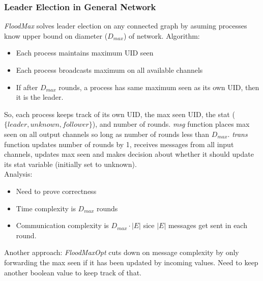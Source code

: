 \documentclass[a4paper,10pt,]{article}
\begin{document}
\subsubsection{Leader Election in General Network}
\emph{FloodMax} solves leader election on any connected graph by asuming processes know upper bound on diameter ($D_{max}$) of network.
Algorithm:
\begin{itemize}
  \item Each process maintains maximum UID seen
  \item Each process broadcasts maximum on all available channels
  \item If after $D_{max}$ rounds, a process has same maximum seen as its own UID, then it is the leader.
\end{itemize}
So, each process keeps track of its own UID, the max seen UID, the stat ($\{leader, unknown, follower\}$), and number of rounds.  \emph{msg} function places max seen on all output channels so long as number of rounds less than $D_{max}$.  \emph{trans} function updates number of rounds by 1, receives messages from all input channels, updates max seen and makes decision about whether it should update its stat variable (initially set to unknown). \\
Analysis:
\begin{itemize}
  \item Need to prove correctness
  \item Time complexity is $D_{max}$ rounds
  \item Communication complexity is $D_{max} \cdot |E|$ sice $|E|$ messages get sent in each round.
\end{itemize}
Another approach: \emph{FloodMaxOpt} cuts down on message complexity by only forwarding the max seen if it has been updated by incoming values.  Need to keep another boolean value to keep track of that.
\end{document}
